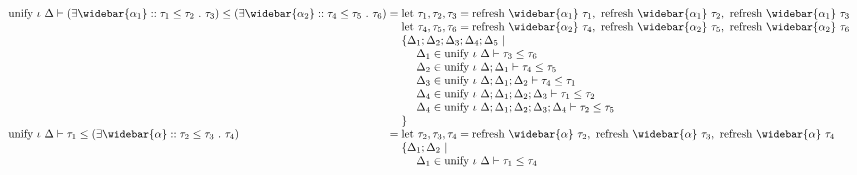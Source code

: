 \documentclass[sigplan,screen]{acmart}
\begin{document}
\begin{figure*}[h]
  \[
    \begin{array}{l @{} l}

      \text{unify } \iota\ \Delta \vdash
      (\exists \widebar{\alpha_1} :: \tau_1 \leq \tau_2\ .\ \tau_3)
      \leq 
      (\exists \widebar{\alpha_2} :: \tau_4 \leq \tau_5\ .\ \tau_6)
      &{} = 
      \begin{array}[t]{@{} l}
        \text{let } \tau_1, \tau_2, \tau_3 = 
        \text{refresh } \widebar{\alpha_1}\ \tau_1,\ 
        \text{refresh } \widebar{\alpha_1}\ \tau_2,\ 
        \text{refresh } \widebar{\alpha_1}\ \tau_3
        \\
        \text{let } \tau_4, \tau_5, \tau_6 = 
        \text{refresh } \widebar{\alpha_2}\ \tau_4,\ 
        \text{refresh } \widebar{\alpha_2}\ \tau_5,\ 
        \text{refresh } \widebar{\alpha_2}\ \tau_6
        \\
        \{\Delta_1;\Delta_2;\Delta_3;\Delta_4;\Delta_5\ |
        \\ 
        \ \ \ \ \Delta_1 \in \text{unify } \iota\ \Delta \vdash \tau_3 \leq \tau_6
        \\
        \ \ \ \ \Delta_2 \in \text{unify } \iota\ \Delta;\Delta_1 \vdash \tau_4 \leq \tau_5
        \\
        \ \ \ \ \Delta_3 \in \text{unify } \iota\ \Delta;\Delta_1;\Delta_2 \vdash \tau_4 \leq \tau_1
        \\
        \ \ \ \ \Delta_4 \in \text{unify } \iota\ \Delta;\Delta_1;\Delta_2;\Delta_3 \vdash \tau_1 \leq \tau_2
        \\
        \ \ \ \ \Delta_4 \in \text{unify } \iota\ \Delta;\Delta_1;\Delta_2;\Delta_3;\Delta_4 \vdash \tau_2 \leq \tau_5
        \\
        \}
      \end{array}
      \\
      \text{unify } \iota\ \Delta \vdash
      \tau_1
      \leq 
      (\exists \widebar{\alpha} :: \tau_2 \leq \tau_3\ .\ \tau_4)
      &{} = 
      \begin{array}[t]{@{} l}
        \text{let } \tau_2, \tau_3, \tau_4 = 
        \text{refresh } \widebar{\alpha}\ \tau_2,\ 
        \text{refresh } \widebar{\alpha}\ \tau_3,\ 
        \text{refresh } \widebar{\alpha}\ \tau_4
        \\
        \{\Delta_1;\Delta_2\ |
        \\ 
        \ \ \ \ \Delta_1 \in \text{unify } \iota\ \Delta \vdash \tau_1 \leq \tau_4

\end{array}
\end{array}\]
\end{figure*}
\end{document}
